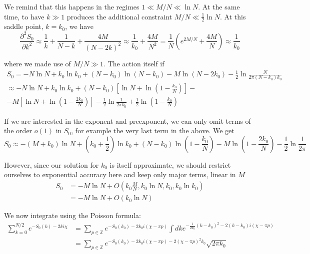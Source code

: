 We remind that this happens in the regimes $1\ll M/N\ll\ln N$. At
the same time, to have $k\gg1$ produces the additional constraint
$M/N\ll\frac{1}{2}\ln N$. At this saddle point, $k=k_{0}$, we have
\[
\frac{\partial^{2}S_{0}}{\partial k^{2}}\approx\frac{1}{k}+\frac{1}{N-k}+\frac{4M}{(N-2k)^{2}}\approx\frac{1}{k_{0}}+\frac{4M}{N^{2}}=\frac{1}{N}\left(e^{2M/N}+\frac{4M}{N}\right)\approx\frac{1}{k_{0}}
\]

where we made use of $M/N\gg1$. The action itself if 
\begin{multline*}
S_{0}=-N\ln N+k_{0}\ln k_{0}+(N-k_{0})\ln(N-k_{0})-M\ln(N-2k_{0})-\frac{1}{2}\ln\frac{N}{2\pi(N-k_{0})k_{0}}\\
\approx-N\ln N+k_{0}\ln k_{0}+(N-k_{0})\left[\ln N+\ln(1-\frac{k_{0}}{N})\right]-\\
-M\left[\ln N+\ln(1-\frac{2k_{0}}{N})\right]-\frac{1}{2}\ln\frac{1}{2\pi k_{0}}+\frac{1}{2}\ln(1-\frac{k_{0}}{N})
\end{multline*}

If we are interested in the exponent and preexponent, we can only
omit terms of the order $o(1)$ in $S_{0}$, for example the very
last term in the above. We get
\[
S_{0}\approx-(M+k_{0})\ln N+(k_{0}+\frac{1}{2})\ln k_{0}+(N-k_{0})\ln(1-\frac{k_{0}}{N})-M\ln(1-\frac{2k_{0}}{N})-\frac{1}{2}\ln\frac{1}{2\pi}
\]

However, since our solution for $k_{0}$ is itself approximate, we
should restrict ourselves to exponential accuracy here and keep only
major terms, linear in $M$
\begin{align*}
S_{0} & =-M\ln N+O(k_{0}\frac{M}{N},k_{0}\ln N,k_{0},k_{0}\ln k_{0})\\
& =-M\ln N+O(k_{0}\ln N)
\end{align*}

We now integrate using the Poisson formula:
\begin{align*}
\sum_{k=0}^{N/2}e^{-S_{0}(k)-2ki\chi} & =\sum_{p\in\mathbb{Z}}e^{-S_{0}(k_{0})-2k_{0}i(\chi-\pi p)}\int dke^{-\frac{1}{2k_{0}}(k-k_{0})^{2}-2(k-k_{0})i(\chi-\pi p)}\\
& =\sum_{p\in\mathbb{Z}}e^{-S_{0}(k_{0})-2k_{0}i(\chi-\pi p)-2(\chi-\pi p)^{2}k_{0}}\sqrt{2\pi k_{0}}
\end{align*}

